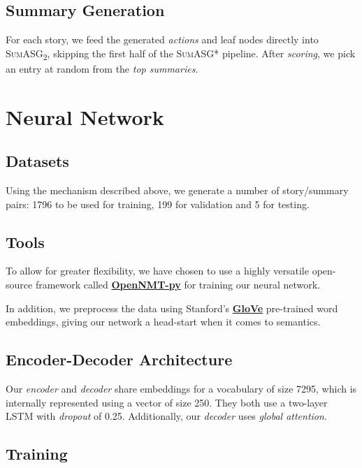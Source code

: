 \subsection{Summary Generation}

For each story, we feed the generated \textit{actions} and leaf nodes directly into \textsc{SumASG\textsubscript{2}}, skipping the first half of the \textsc{SumASG*} pipeline. After \textit{scoring}, we pick an entry at random from the \textit{top summaries}.

\section{Neural Network}

\subsection{Datasets}

Using the mechanism described above, we generate a number of story/summary pairs: 1796 to be used for training, 199 for validation and 5 for testing.

\subsection{Tools}

To allow for greater flexibility, we have chosen to use a highly versatile open-source framework called \textbf{\href{https://github.com/OpenNMT/OpenNMT-py}{OpenNMT-py}} for training our neural network.

In addition, we preprocess the data using Stanford's \textbf{\href{https://nlp.stanford.edu/projects/glove/}{GloVe}} pre-trained word embeddings, giving our network a head-start when it comes to semantics.

\subsection{Encoder-Decoder Architecture}

Our \textit{encoder} and \textit{decoder} share embeddings for a vocabulary of size 7295, which is internally represented using a vector of size 250. They both use a two-layer LSTM with \textit{dropout} of 0.25. Additionally, our \textit{decoder} uses \textit{global attention}.

\subsection{Training}


